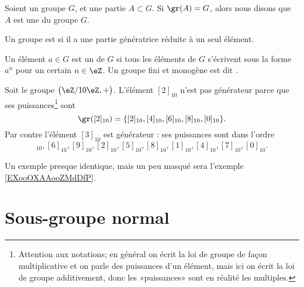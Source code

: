 \begin{definition}  \label{DEFooWMFVooLDqVxR}
	Soient un groupe \( G\), et une partie \( A\subset G\). Si \( \gr(A)=G\), alors nous disons que \( A\) est une  du groupe \( G\).

	Un groupe est  si il a une partie génératrice réduite à un seul élément.
\end{definition}

\begin{definition}     \label{DefHFJWooFxkzCF}
	Un élément \( a\in G\) est un  de \( G\) si tous les éléments de \( G\) s'écrivent sous la forme \( a^n\) pour un certain \( n\in\eZ\). Un groupe fini et monogène est dit .
\end{definition}

\begin{example}
	Soit le groupe \( \big( \eZ/10\eZ,+ \big)\). L'élément \( [2]_{10}\) n'est pas générateur parce que ses puissances\footnote{Attention aux notations; en général on écrit la loi de groupe de façon multiplicative et on parle des puissances d'un élément, mais ici on écrit la loi de groupe additivement, donc les «puissances» sont en réalité les multiples.} sont
	\begin{equation}
		\gr([2]_{10})=\{ [2]_{10},[4]_{10},[6]_{10},[8]_{10},[0]_{10} \}.
	\end{equation}
	Par contre l'élément \( [3]_{10}\) est générateur : ses puissances sont dans l'ordre
	\begin{equation}
		[3]_{10}, [6]_{10}, [9]_{10}, [2]_{10}, [5]_{10}, [8]_{10},[1]_{10},[4]_{10},[7]_{10},[0]_{10}.
	\end{equation}
\end{example}

Un exemple presque identique, mais un peu masqué sera l'exemple \ref{EXooOXAAooZMdDfP}.

\section{Sous-groupe normal}

